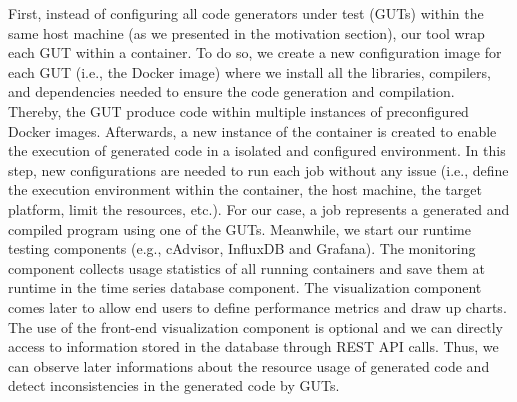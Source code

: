 First, instead of configuring all code generators under test (GUTs) within the same host machine (as we presented in the motivation section), our tool wrap each GUT within a container. To do so, we create a new configuration image for each GUT (i.e., the Docker image) where we install all the libraries, compilers, and dependencies needed to ensure the code generation and compilation. Thereby, the GUT produce code within multiple instances of preconfigured Docker images. Afterwards, a new instance of the container is created to enable the execution of generated code in a isolated and configured environment. In this step, new configurations are needed to run each job without any issue (i.e., define the execution environment within the container, the host machine, the target platform, limit the resources, etc.). For our case, a job represents a generated and compiled program using one of the GUTs. Meanwhile, we start our runtime testing components (e.g., cAdvisor, InfluxDB and Grafana). The monitoring component collects usage statistics of all running containers and save them at runtime in the time series database component. The visualization component comes later to allow end users to define performance metrics and draw up charts. The use of the front-end visualization component is optional and we can directly access to information stored in the database through REST API calls. Thus, we can observe later informations about the resource usage of generated code and detect inconsistencies in the generated code by GUTs. 





